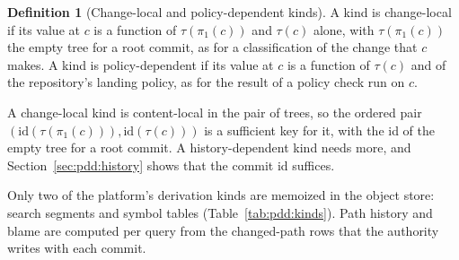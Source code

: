 \documentclass[11pt,letterpaper]{article}
\theoremstyle{definition}
\newtheorem{definition}[theorem]{Definition}
\theoremstyle{remark}
\newcommand{\id}{\mathrm{id}}
\newcommand{\tree}{\tau}
\begin{document}
\begin{definition}[Change-local and policy-dependent kinds]
\label{def:pdd:change-local}
A kind is change-local if its value at $c$ is a function of $\tree(\pi_1(c))$ and $\tree(c)$ alone, with $\tree(\pi_1(c))$ the empty tree for a root commit, as for a classification of the change that $c$ makes. A kind is policy-dependent if its value at $c$ is a function of $\tree(c)$ and of the repository's landing policy, as for the result of a policy check run on $c$.
\end{definition}

A change-local kind is content-local in the pair of trees, so the ordered pair $(\id(\tree(\pi_1(c))),\id(\tree(c)))$ is a sufficient key for it, with the id of the empty tree for a root commit. A history-dependent kind needs more, and Section~\ref{sec:pdd:history} shows that the commit id suffices.

Only two of the platform's derivation kinds are memoized in the object store: search segments and symbol tables (Table~\ref{tab:pdd:kinds}). Path history and blame are computed per query from the changed-path rows that the authority writes with each commit.
\end{document}
